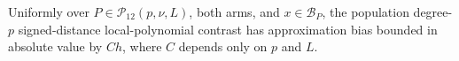 Uniformly over \(P\in\mathcal P_{12}(p,\nu,L)\), both arms, and \(x\in\mathcal B_P\), the population degree-\(p\) signed-distance local-polynomial contrast has approximation bias bounded in absolute value by \(Ch\), where \(C\) depends only on \(p\) and \(L\).